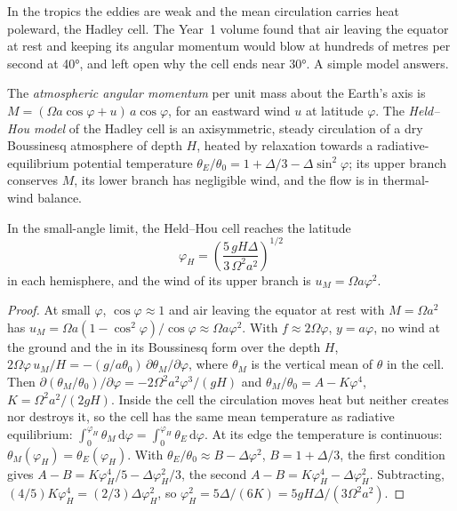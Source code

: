 In the tropics the eddies are weak and the mean circulation carries heat
poleward, the Hadley cell. The Year~1 volume found that air leaving the
equator at rest and keeping its angular momentum would blow at hundreds of
metres per second at \ang{40}, and left open why the cell ends near
\ang{30}. A simple model answers.

\begin{definition}\label{def:b3:atmospheric-dynamics:held-hou}
The \emph{atmospheric angular momentum}
per unit mass about the Earth's axis is $M = (\Omega a\cos\varphi +
u)\,a\cos\varphi$, for an eastward wind $u$ at latitude $\varphi$. The
\emph{Held--Hou model} of the Hadley cell is an
axisymmetric, steady circulation of a dry Boussinesq atmosphere of depth
$H$, heated by relaxation towards a radiative-equilibrium potential
temperature $\theta_E/\theta_0 = 1 + \Delta/3 - \Delta\sin^2\varphi$; its
upper branch conserves $M$, its lower branch has negligible wind, and the
flow is in thermal-wind balance.
\end{definition}

\begin{theorem}\label{thm:b3:atmospheric-dynamics:held-hou}
In the small-angle limit, the Held--Hou cell reaches the latitude
\[
\varphi_H = \left(\frac{5\,gH\Delta}{3\,\Omega^2a^2}\right)^{1/2}
\]
in each hemisphere, and the wind of its upper branch is $u_M = \Omega
a\varphi^2$.
\end{theorem}

\begin{proof}
At small $\varphi$, $\cos\varphi \approx 1$ and air leaving the equator at
rest with $M = \Omega a^2$ has $u_M = \Omega a(1 - \cos^2\varphi)/\cos\varphi
\approx \Omega a\varphi^2$. With $f \approx 2\Omega\varphi$, $y = a\varphi$,
no wind at the ground and the  in its Boussinesq form over the
depth $H$, $2\Omega\varphi\,u_M/H = -(g/a\theta_0)\,\partial\theta_M/
\partial\varphi$, where $\theta_M$ is the vertical mean of $\theta$ in the
cell. Then $\partial(\theta_M/\theta_0)/\partial\varphi = -2\Omega^2a^2
\varphi^3/(gH)$ and $\theta_M/\theta_0 = A - K\varphi^4$, $K = \Omega^2a^2/
(2gH)$. Inside the cell the circulation moves heat but neither creates nor
destroys it, so the cell has the same mean temperature as radiative
equilibrium: $\int_0^{\varphi_H}\theta_M\,\mathrm d\varphi = \int_0^{\varphi_H}
\theta_E\,\mathrm d\varphi$. At its edge the temperature is continuous:
$\theta_M(\varphi_H) = \theta_E(\varphi_H)$. With $\theta_E/\theta_0 \approx
B - \Delta\varphi^2$, $B = 1 + \Delta/3$, the first condition gives $A - B =
K\varphi_H^4/5 - \Delta\varphi_H^2/3$, the second $A - B = K\varphi_H^4 -
\Delta\varphi_H^2$. Subtracting, $(4/5)K\varphi_H^4 = (2/3)\Delta
\varphi_H^2$, so $\varphi_H^2 = 5\Delta/(6K) = 5gH\Delta/(3\Omega^2a^2)$.
\end{proof}

